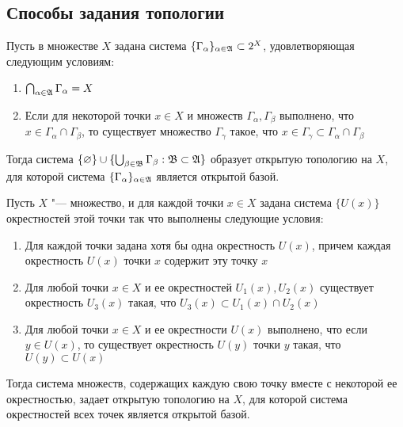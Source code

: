 \subsection{Способы задания топологии}

\begin{example}
    Пусть в множестве $X$ задана система $\{\Gamma_{\alpha}\}_{\alpha \in \mathfrak A} \subset 2^X$, удовлетворяющая следующим условиям:
    \begin{enumerate}
        \item $\bigcap_{\alpha \in \mathfrak A} \Gamma_\alpha = X$
        
        \item Если для некоторой точки $x \in X$ и множеств $\Gamma_\alpha, \Gamma_\beta$ выполнено, что $x \in \Gamma_{\alpha}\cap\Gamma_{\beta}$, то существует множество $\Gamma_{\gamma}$ такое, что $x\in\Gamma_{\gamma}\subset \Gamma_{\alpha}\cap\Gamma_{\beta}$
    \end{enumerate}

    Тогда система $\{\varnothing\} \cup \{\bigcup_{\beta \in \mathfrak B} \Gamma_\beta: \mathfrak B \subset \mathfrak A\}$ образует открытую топологию на $X$, для которой система $\{\Gamma_{\alpha}\}_{\alpha \in \mathfrak A}$ является открытой базой.
\end{example}

\begin{example}
    Пусть $X$ "--- множество, и для каждой точки $x \in X$ задана система $\{U(x)\}$ окрестностей этой точки так что выполнены следующие условия:
    \begin{enumerate}
        \item Для каждой точки задана хотя бы одна окрестность $U(x)$, причем каждая окрестность $U(x)$ точки $x$ содержит эту точку $x$
        
        \item Для любой точки $x \in X$ и ее окрестностей $U_1(x), U_2(x)$ существует окрестность $U_3(x)$ такая, что $U_3(x)\subset U_1(x)\cap U_2(x)$
        
        \item Для любой точки $x \in X$ и ее окрестности $U(x)$ выполнено, что если $y \in U(x)$, то существует окрестность $U(y)$ точки $y$ такая, что $U(y) \subset U(x)$
    \end{enumerate}

    Тогда система множеств, содержащих каждую свою точку вместе с некоторой ее окрестностью, задает открытую топологию на $X$, для которой система окрестностей всех точек является открытой базой.
\end{example}


